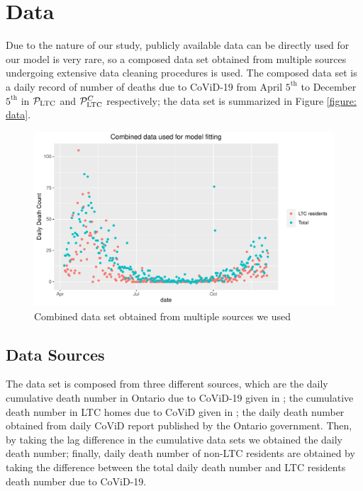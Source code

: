 \documentclass[12pt]{article}
\begin{document}
\section{Data} \label{section methods}

Due to the nature of our study, publicly available data can be directly used for our model is very rare, so a composed data set obtained
from multiple sources undergoing extensive data cleaning procedures is used.
The composed data set is a daily record of number of deaths
due to CoViD-19 from April $5^{\text{th}}$ to December $5^{\text{th}}$ in
$\mathcal P_{\mathrm{LTC}}$ and $\mathcal P_{\mathrm{LTC}}^C$ respectively; the data set
is summarized in Figure \ref{figure: data}.

\begin{figure}
    \centering
    \includegraphics[scale = 0.7]{plot_combined_data.pdf}
    \caption{Combined data set obtained from multiple sources we used \label{figure: data} }\label{fig:foobar}
\end{figure}

\subsection{Data Sources}
The data set is composed from three different sources, which are
the daily cumulative death number in Ontario due to CoViD-19 given
in \cite{cite1}; the cumulative death number in LTC homes due to CoViD given in
\cite{cite2}; the daily death number obtained from daily CoViD report published
by the Ontario government. Then, by taking the lag difference in the cumulative
data sets we obtained the daily death number; finally, daily death number of
non-LTC residents are obtained by taking the difference between the total daily death number and LTC residents death number due to CoViD-19.
\end{document}
